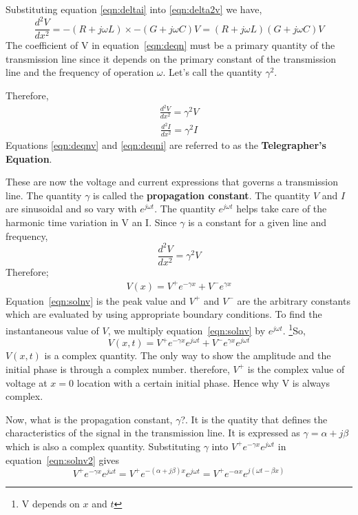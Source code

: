 Substituting equation \eqref{eqn:deltai} into \eqref{eqn:delta2v} we have,
\begin{dmath}
\frac{d^{2}V}{dx^{2}} = - (R + j\omega L)\times -(G + j\omega C)V = (R + j\omega L)(G + j\omega C)V 
\label{eqn:deqn}
\end{dmath}   
The coefficient of V in equation~\ref{eqn:deqn} must be a primary quantity of the transmission line since it depends on the primary constant of the transmission line and the frequency of operation $ \omega$. Let's call the quantity $ \gamma^{2}. $ 

Therefore, 
\begin{align}
\frac{d^{2}V}{dx^{2}} = \gamma^{2}V 
\label{eqn:deqnv}
\end{align}
\begin{align}
\frac{d^{2}I}{dx^{2}} = \gamma^{2}I 
\label{eqn:deqni}
\end{align}
Equations \ref{eqn:deqnv} and \ref{eqn:deqni} are referred to as the \textbf{Telegrapher's Equation}.

These are now the voltage and current expressions that governs a transmission line. The quantity $ \gamma $ is called the \textbf{propagation constant}. The quantity $V$ and $I$ are sinusoidal and so vary with $e^{j\omega t}$. The quantity $ e ^{j\omega t} $ helps take care of the harmonic time variation in V an I. 
Since $ \gamma $ is a constant for a given line and frequency, 
\[ \frac{d^{2}V}{dx^{2}} = \gamma^{2}V\]
Therefore; 
\begin{align}
V(x) = V^{+} e ^{- \gamma x} + V^{-}e^{\gamma x}  
\label{eqn:solnv}
\end{align}
Equation~\eqref{eqn:solnv} is the peak value and $V^+$ and $V^-$ are the arbitrary constants which are evaluated by using appropriate boundary conditions. To find the instantaneous value of $V$, we multiply equation~\eqref{eqn:solnv} by $e^{j\omega t}$. \footnote{V depends on $x$ and $t$}So,
\begin{dmath}
V(x,t) = V^{+} e^{-\gamma x}e^{j\omega t} + V^{-} e^{\gamma x}e^{j\omega t}
\label{eqn:solnv2}
\end{dmath}
$V(x,t)$ is a complex quantity. The only way to show the amplitude and the initial phase is through a complex number. therefore, $ V^{+}$ is the complex value of voltage at $x=0$ location with a certain initial phase. Hence why V is always complex. 

Now, what is the propagation constant, $\gamma$?. It is the quatity that defines the characteristics of the signal in the transmission line. It is expressed as $ \gamma = \alpha + j\beta $	 which is also a complex quantity. Substituting $\gamma$ into $V^{+}e^{- \gamma x}e^{j \omega t}$ in equation~\eqref{eqn:solnv2} gives
\begin{dmath}
V^{+}e^{- \gamma x}e^{j \omega t} = V^{+}e^{-( \alpha + j \beta )x}e^{j \omega t} = V^{+}e^{-\alpha x}e^{j(\omega t - \beta x)}
\end{dmath}

